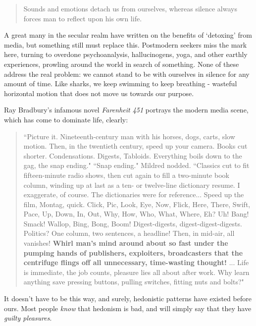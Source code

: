 \documentclass[letterpaper]{article}
\begin{document}
\begin{quote}
  Sounds and emotions detach us from ourselves, whereas silence always forces man to reflect upon his own life.
\end{quote}

A great many in the secular realm have written on the benefits of `detoxing' from media, but something still must replace this. Postmodern seekers miss the mark here, turning to overdone psychoanalysis, hallucinogens, yoga, and other earthly experiences, prowling around the world in search of something. None of these address the real problem: we cannot stand to be with ourselves in silence for any amount of time. Like sharks, we keep swimming to keep breathing - wasteful horizontal motion that does not move us towards our purpose.

Ray Bradbury's infamous novel \textit{Farenheit 451} portrays the modern media scene, which has come to dominate life, clearly:

\begin{quote}
  ``Picture it. Nineteenth-century man with his horses, dogs, carts, slow motion. Then, in the twentieth century, speed up your camera. Books cut shorter. Condensations. Digests, Tabloids. Everything boils down to the gag, the snap ending." ``Snap ending." Mildred nodded. ``Classics cut to fit fifteen-minute radio shows, then cut again to fill a two-minute book column, winding up at last as a ten- or twelve-line dictionary resume. I exaggerate, of course. The dictionaries were for reference... Speed up the film, Montag, quick. Click, Pic, Look, Eye, Now, Flick, Here, There, Swift, Pace, Up, Down, In, Out, Why, How, Who, What, Where, Eh? Uh! Bang! Smack! Wallop, Bing, Bong, Boom! Digest-digests, digest-digest-digests. Politics? One column, two sentences, a headline! Then, in mid-air, all vanishes! \textbf{Whirl man’s mind around about so fast under the pumping hands of publishers, exploiters, broadcasters that the centrifuge flings off all unnecessary, time-wasting thought!} ... Life is immediate, the job counts, pleasure lies all about after work. Why learn anything save pressing buttons, pulling switches, fitting nuts and bolts?"
\end{quote}

It doesn't have to be this way, and surely, hedonistic patterns have existed before ours. Most people \textit{know} that hedonism is bad, and will simply say that they have \textit{guilty pleasures}. 
\end{document}
